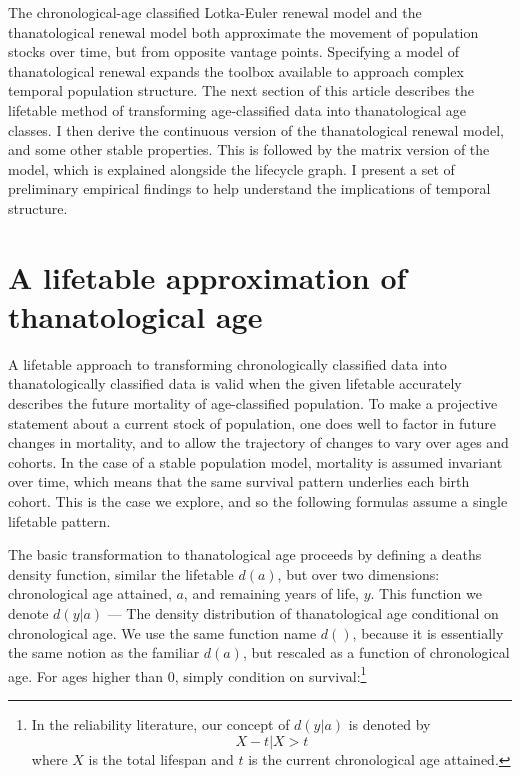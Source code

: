 \documentclass{article}
\begin{document}
The chronological-age classified Lotka-Euler renewal model and the
thanatological renewal model both approximate the movement of population stocks
over time, but from opposite vantage points. Specifying a model of
thanatological renewal expands the toolbox available to approach complex
temporal population structure. The next section of this article describes the lifetable method of transforming age-classified
data into thanatological age classes. I then derive the continuous version of
the thanatological renewal model, and some other stable properties. This is
followed by the matrix version of the model, which is explained alongside the
lifecycle graph. I present a set of preliminary empirical findings to help
understand the implications of temporal structure.

\section*{A lifetable approximation of thanatological age}

A lifetable approach to transforming chronologically classified data into
thanatologically classified data is valid when the given lifetable accurately
describes the future mortality of age-classified population. To make
a projective statement about a current stock of population, one does well to
factor in future changes in mortality, and to allow the trajectory of changes
to vary over ages and cohorts. In the case of a stable population model,
mortality is assumed invariant over time, which means that the same survival
pattern underlies each birth cohort. This is the case we explore, and so the
following formulas assume a single lifetable pattern. 

The basic transformation to thanatological age proceeds by defining a
deaths density function, similar the lifetable $d(a)$, but over two
dimensions: chronological age attained, $a$, and remaining years of life, $y$.
This function we denote $d(y|a)$ --- The density distribution of thanatological
age conditional on chronological age. We use the same function name $d()$,
because it is essentially the same notion as the familiar $d(a)$, but rescaled as a
function of chronological age. For ages higher than 0, simply condition
on survival:\footnote{In the reliability literature, our concept of $d(y|a)$ is denoted by \begin{equation} X - t | X > t
\end{equation}
where $X$ is the total lifespan and $t$ is the current chronological age
attained.}
\end{document}
